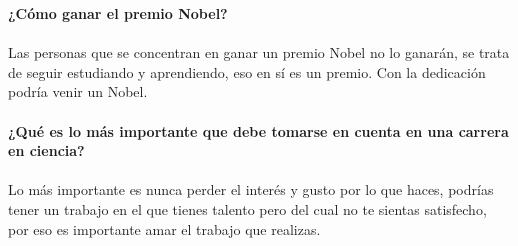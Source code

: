 \documentclass[10pt,letterpaper]{article}
\begin{document}
\textbf{¿Cómo ganar el premio Nobel?}
\\
\\
Las personas que se concentran en ganar un premio Nobel no lo ganarán, se trata de seguir estudiando y aprendiendo, eso en sí es un premio. Con la dedicación podría venir un Nobel.
\\
\\
\textbf{¿Qué es lo más importante que debe tomarse en cuenta en una carrera en ciencia?}
\\
\\
Lo más importante es nunca perder el interés y gusto por lo que haces, podrías tener un trabajo en el que tienes talento pero del cual no te sientas satisfecho, por eso es importante amar el trabajo que realizas.
\\
\\
\end{document}
